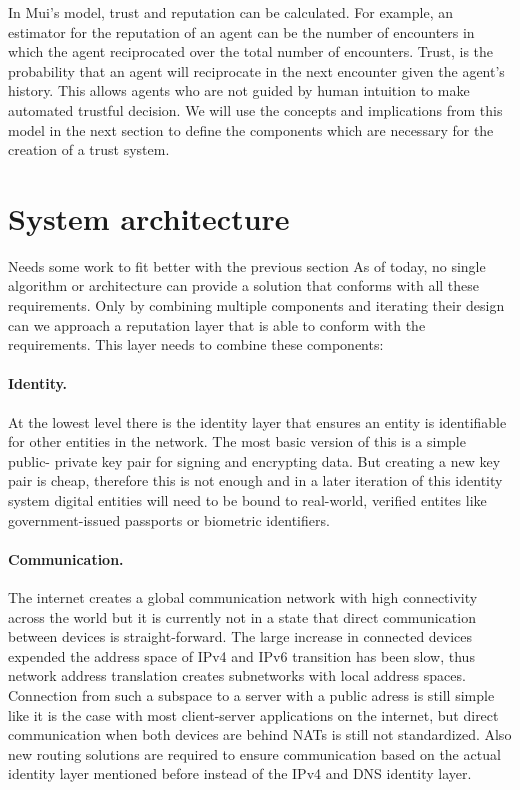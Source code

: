 In Mui's model, trust and reputation can be calculated. For example, an estimator for the reputation
of an agent can be the number of encounters in which the agent reciprocated over the total number of 
encounters. Trust, is the probability that an agent will reciprocate in the next encounter given 
the agent's history. This allows agents who are not guided by human intuition to make automated 
trustful decision. We will use the concepts and implications from this model in the next section 
to define the components which are necessary for the creation of a trust system.

\section{System architecture}
{\color{red} Needs some work to fit better with the previous section}
As of today, no single algorithm or architecture can provide a solution that conforms with all these 
requirements. Only by combining multiple components and iterating their design can we approach a 
reputation layer that is able to conform with the requirements. This layer needs to combine these
components:

\paragraph{Identity.} At the lowest level there is the identity layer that ensures an entity is 
identifiable for other entities in the network. The most basic version of this is a simple public-
private key pair for signing and encrypting data. But creating a new key pair is cheap, therefore 
this is not enough and in a later iteration of this identity system digital entities will need to be 
bound to real-world, verified entites like government-issued passports or biometric identifiers.

\paragraph{Communication.} The internet creates a global communication network with high connectivity
across the world but it is currently not in a state that direct communication between devices is 
straight-forward. The large increase in connected devices expended the address space of IPv4 and IPv6
transition has been slow, thus network address translation creates subnetworks with local address 
spaces. Connection from such a subspace to a server with a public adress is still simple like it is
the case with most client-server applications on the internet, but direct communication when both 
devices are behind NATs is still not standardized. Also new routing solutions are required to ensure
communication based on the actual identity layer mentioned before instead of the IPv4 and DNS identity
layer.

